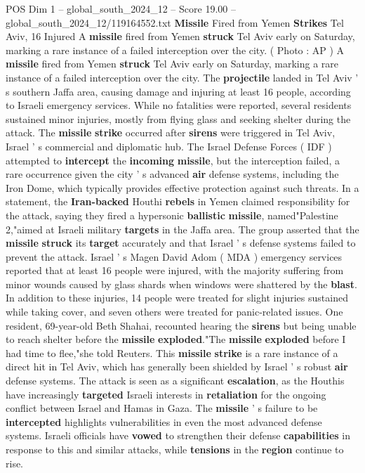 \begin{textsample}{POS Dim 1 – global\_south\_2024\_12 – Score 19.00 – global\_south\_2024\_12/119164552.txt}  \label{ex:f1_pos_197}
\textbf{Missile} Fired from Yemen \textbf{Strikes} Tel Aviv, 16 Injured A \textbf{missile} fired from Yemen \textbf{struck} Tel Aviv early on Saturday, marking a rare instance of a failed interception over the city. ( Photo : AP ) A \textbf{missile} fired from Yemen \textbf{struck} Tel Aviv early on Saturday, marking a rare instance of a failed interception over the city.
The \textbf{projectile} landed in Tel Aviv ' s southern Jaffa area, causing damage and injuring at least 16 people, according to Israeli emergency services.
While no fatalities were reported, several residents sustained minor injuries, mostly from flying glass and seeking shelter during the attack.
The \textbf{missile} \textbf{strike} occurred after \textbf{sirens} were triggered in Tel Aviv, Israel ' s commercial and diplomatic hub.
The Israel Defense Forces ( IDF ) attempted to \textbf{intercept} the \textbf{incoming} \textbf{missile}, but the interception failed, a rare occurrence given the city ' s advanced \textbf{air} defense systems, including the Iron Dome, which typically provides effective protection against such threats.
In a statement, the \textbf{Iran-backed} Houthi \textbf{rebels} in Yemen claimed responsibility for the attack, saying they fired a hypersonic \textbf{ballistic} \textbf{missile}, named"Palestine 2,"aimed at Israeli military \textbf{targets} in the Jaffa area.
The group asserted that the \textbf{missile} \textbf{struck} its \textbf{target} accurately and that Israel ' s defense systems failed to prevent the attack.
Israel ' s Magen David Adom ( MDA ) emergency services reported that at least 16 people were injured, with the majority suffering from minor wounds caused by glass shards when windows were shattered by the \textbf{blast}.
In addition to these injuries, 14 people were treated for slight injuries sustained while taking cover, and seven others were treated for panic-related issues.
One resident, 69-year-old Beth Shahai, recounted hearing the \textbf{sirens} but being unable to reach shelter before the \textbf{missile} \textbf{exploded}."The \textbf{missile} \textbf{exploded} before I had time to flee,"she told Reuters.
This \textbf{missile} \textbf{strike} is a rare instance of a direct hit in Tel Aviv, which has generally been shielded by Israel ' s robust \textbf{air} defense systems.
The attack is seen as a significant \textbf{escalation}, as the Houthis have increasingly \textbf{targeted} Israeli interests in \textbf{retaliation} for the ongoing conflict between Israel and Hamas in Gaza.
The \textbf{missile} ' s failure to be \textbf{intercepted} highlights vulnerabilities in even the most advanced defense systems.
Israeli officials have \textbf{vowed} to strengthen their defense \textbf{capabilities} in response to this and similar attacks, while \textbf{tensions} in the \textbf{region} continue to rise.

\end{textsample}
